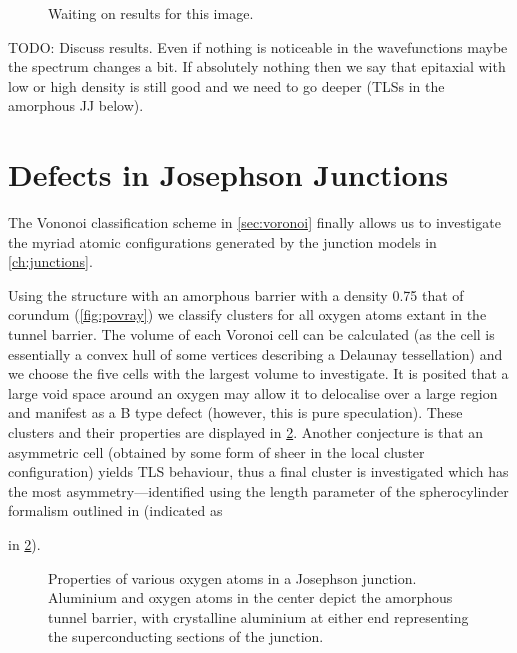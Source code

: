 \begin{figure}[htp]
\caption[Strain on a Crystalline Lattice]{\label{fig:cluststrain}Waiting on results for this image.}
\end{figure}

TODO: Discuss results.
Even if nothing is noticeable in the wavefunctions maybe the spectrum changes a bit.
If absolutely nothing then we say that epitaxial with low or high density is still good and we need to go deeper (TLSs in the amorphous JJ below).

\section{Defects in Josephson Junctions}\label{sec:jjtls}

The Vononoi classification scheme in \cref{sec:voronoi} finally allows us to investigate the myriad atomic configurations generated by the junction models in \cref{ch:junctions}.

Using the structure with an  amorphous barrier with a density 0.75 that of corundum (\cref{fig:povray}) we classify clusters for all oxygen atoms extant in the tunnel barrier.
The volume of each Voronoi cell can be calculated (as the cell is essentially a convex hull of some vertices describing a Delaunay tessellation) and we choose the five cells with the largest volume to investigate.
It is posited that a large void space around an oxygen may allow it to delocalise over a large region and manifest as a B type defect (however, this is pure speculation).
These clusters and their properties are displayed in \cref{fig:tlsinjj}.
Another conjecture is that an asymmetric cell (obtained by some form of sheer in the local cluster configuration) yields TLS behaviour, thus a final cluster is investigated which has the most asymmetry---identified using the length parameter of the spherocylinder formalism outlined in  (indicated as  in \cref{fig:tlsinjj}).

\begin{figure}[htp]
\tlsjjmargins
\begin{adjustwidth}{\tlsjjleft}{\tlsjjright}
\resizebox{\widefigure}{!}{}
  \caption[Oxygen Properties in a Josephson Junction]{\label{fig:tlsinjj}Properties of various oxygen atoms in a Josephson junction. Aluminium  and oxygen  atoms in the center depict the amorphous tunnel barrier, with crystalline aluminium at either end representing the superconducting sections of the junction.}
\end{adjustwidth}
\end{figure}

